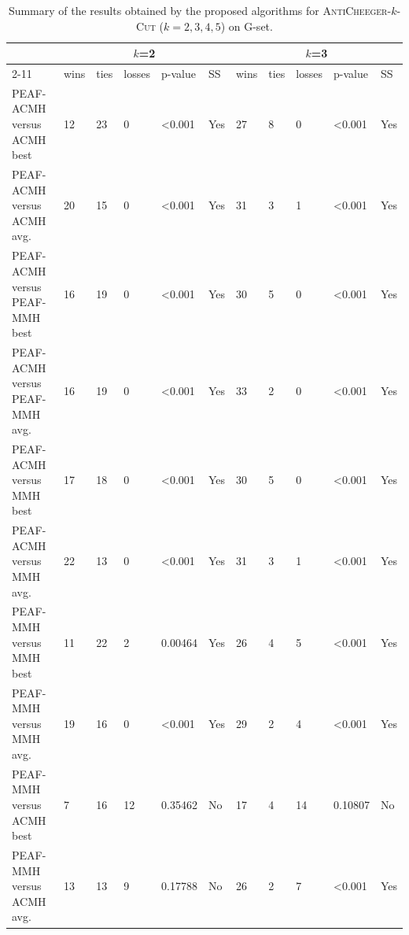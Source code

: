 \documentclass[12pt, a4paper]{article}%
\renewcommand{\arraystretch}{1.3}
\numberwithin{equation}{section}
\theoremstyle{plain}
\begin{document}
				{
					\scriptsize
					\setlength{\tabcolsep}{10pt}
					\renewcommand{\arraystretch}{1.6}
					\begin{landscape}
						\begin{longtable}{|l|lllll|lllll|}
							\caption[Summary for \textsc{AntiCheeger}-$k$-\textsc{Cut}]{Summary of the results obtained by the proposed algorithms for \textsc{AntiCheeger}-$k$-\textsc{Cut} ($k=2,3,4,5$) on G-set.}
							\label{tab::anticheeger-summary}\\
							\hline
							\multicolumn{1}{|c|}{\multirow{2}{*}{}} & \multicolumn{5}{c|}{$k$=2}                    & \multicolumn{5}{c|}{$k$=3}                    \\ \cline{2-11} 
							\multicolumn{1}{|c|}{}                  & wins & ties & losses & p-value          & SS  & wins & ties & losses & p-value          & SS  \\ \hline
							PEAF-ACMH versus ACMH best             & 12   & 23   & 0      & \textless{}0.001 & Yes & 27   & 8    & 0      & \textless{}0.001 & Yes \\
							PEAF-ACMH versus ACMH avg.             & 20   & 15   & 0      & \textless{}0.001 & Yes & 31   & 3    & 1      & \textless{}0.001 & Yes \\
							PEAF-ACMH versus PEAF-MMH best           & 16   & 19   & 0      & \textless{}0.001 & Yes & 30   & 5    & 0      & \textless{}0.001 & Yes \\
							PEAF-ACMH versus PEAF-MMH avg.           & 16   & 19   & 0      & \textless{}0.001 & Yes & 33   & 2    & 0      & \textless{}0.001 & Yes \\
							PEAF-ACMH versus MMH best               & 17   & 18   & 0      & \textless{}0.001 & Yes & 30   & 5    & 0      & \textless{}0.001 & Yes \\
							PEAF-ACMH versus MMH avg.               & 22   & 13   & 0      & \textless{}0.001 & Yes & 31   & 3    & 1      & \textless{}0.001 & Yes \\
							PEAF-MMH versus MMH best                 & 11   & 22   & 2      & 0.00464          & Yes & 26   & 4    & 5      & \textless{}0.001 & Yes \\
							PEAF-MMH versus MMH avg.                 & 19   & 16   & 0      & \textless{}0.001 & Yes & 29   & 2    & 4      & \textless{}0.001 & Yes \\
							PEAF-MMH versus ACMH best               & 7    & 16   & 12     & 0.35462          & No  & 17   & 4    & 14     & 0.10807          & No  \\
							PEAF-MMH versus ACMH avg.               & 13   & 13   & 9      & 0.17788          & No  & 26   & 2    & 7      & \textless{}0.001 & Yes \\

\end{longtable}
\end{landscape}}
\end{document}
